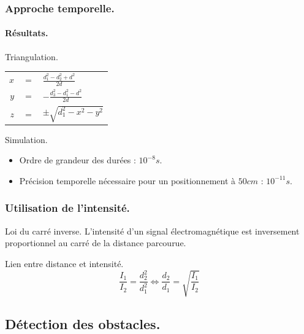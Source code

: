 \begin{frame}
    \frametitle{Approche temporelle.}
    \framesubtitle{Résultats.}
    \begin{block}{Triangulation.}
        \begin{center}
            \begin{tabular}{rcl}
                $x$ & $=$ & $\frac{d_1^2-d_2^2+d^2}{2d}$ \\
                $y$ & $=$ & $-\frac{d_3^2-d_1^2-d^2}{2d}$ \\
                $z$ & $=$ & $\pm\sqrt{d_1^2-x^2-y^2}$ \\
            \end{tabular}
        \end{center}
    \end{block}
     {
        \begin{exampleblock}{Simulation.}
            \begin{itemize}
                \pause \item Ordre de grandeur des durées : $10^{-8}s$.
                \pause \item Précision temporelle nécessaire pour un positionnement à $50cm$ : $10^{-11}s$.
            \end{itemize}
        \end{exampleblock}
    }
\end{frame}

\begin{frame}
    \frametitle{Utilisation de l'intensité.}
    \begin{exampleblock}{Loi du carré inverse.}
        L'intensité d'un signal électromagnétique est inversement proportionnel au carré de la distance parcourue.
    \end{exampleblock}
     { \begin{block}{Lien entre distance et intensité.}
            \[ \frac{I_1}{I_2} = \frac{d_2^2}{d_1^2} \Leftrightarrow \frac{d_2}{d_1} = \sqrt{\frac{I_1}{I_2}} \]
    \end{block} }
\end{frame}

\subsection[Obstacles]{Détection des obstacles.}

